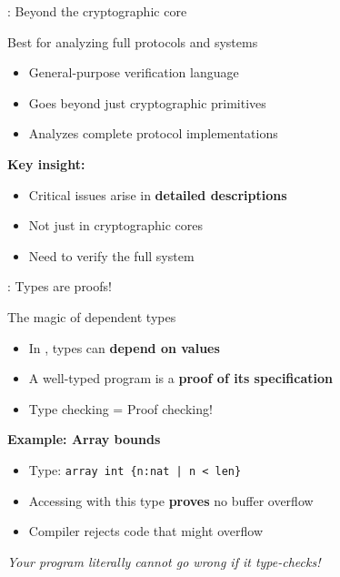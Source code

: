 \documentclass[aspectratio=169, lualatex, handout]{beamer}
\begin{document}
\begin{frame}{\fstar: Beyond the cryptographic core}
	\begin{center}
		\Large
		Best for analyzing full protocols and systems
	\end{center}
	\vspace{1em}
	\begin{itemize}
		\item General-purpose verification language
		\item Goes beyond just cryptographic primitives
		\item Analyzes complete protocol implementations
	\end{itemize}
	\vspace{0.5em}
	\textbf{Key insight:}
	\begin{itemize}
		\item Critical issues arise in \textbf{detailed descriptions}
		\item Not just in cryptographic cores
		\item Need to verify the full system
	\end{itemize}
\end{frame}

\begin{frame}{\fstar: Types are proofs!}
	\begin{center}
		\Large
		The magic of dependent types
	\end{center}
	\vspace{1em}
	\begin{itemize}
		\item In \fstar, types can \textbf{depend on values}
		\item A well-typed program is a \textbf{proof of its specification}
		\item Type checking = Proof checking!
	\end{itemize}
	\vspace{0.5em}
	\textbf{Example: Array bounds}
	\begin{itemize}
		\item Type: \texttt{array int \{n:nat | n < len\}}
		\item Accessing with this type \textbf{proves} no buffer overflow
		\item Compiler rejects code that might overflow
	\end{itemize}
	\vspace{0.5em}
	\begin{center}
		\textit{Your program literally cannot go wrong if it type-checks!}
	\end{center}
\end{frame}
\end{document}
